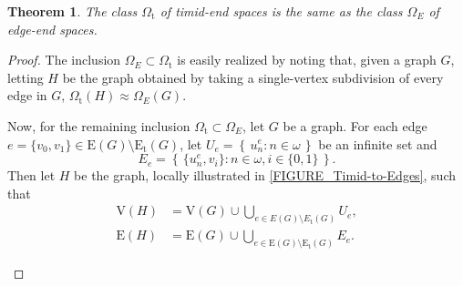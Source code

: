 \documentclass[10pt]{article}
\newcommand{\myref}[1]{\hyperref[#1]{\namecref{#1} \ref{#1}}}
\numberwithin{equation}{subsection}
\newtheorem{theorem}[equation]{Theorem}
\theoremstyle{remark}
\newcommand{\set}[1]{\left\{\, {#1} \,\right\}}
\begin{document}
\begin{theorem}\label{THM_EdgeEndsHomeoTimidEnds}
    The class $\Omega_{\mathrm{t}}$ of timid-end spaces is the same as the class $\Omega_E$ of edge-end spaces. 
\end{theorem}
\begin{proof}
    The inclusion $\Omega_E\subset \Omega_{\mathrm{t}}$ is easily realized by noting that, given a graph $G$, letting $H$ be the graph obtained by taking a single-vertex subdivision of every edge in $G$, $\Omega_{\mathrm{t}}(H) \approx \Omega_E(G)$.

    Now, for the remaining inclusion $\Omega_{\mathrm{t}}\subset \Omega_E$, let $G$ be a graph. For each edge $e = \{v_0,v_1\}\in \mathrm{E}(G)\setminus \mathrm{E}_\mathrm{t}(G)$, let $U_e = \set{u_n^e:n\in \omega}$ be an infinite set and  
    \[
    E_e = \set{\{u_n^e, v_i\}:n\in\omega, i\in \{0,1\}}.
    \]
    Then let $H$ be the graph, locally illustrated in \myref{FIGURE_Timid-to-Edges}, such that 
    \begin{align*}
        \mathrm{V}(H) &= \mathrm{V}(G)\cup \bigcup_{e\in E(G)\setminus E_\mathrm{t}(G)}U_e,\\
        \mathrm{E}(H) &= \mathrm{E}(G)\cup \bigcup_{e\in \mathrm{E}(G)\setminus \mathrm{E}_\mathrm{t}(G)}E_e.
    \end{align*}
    
    \begin{figure}[ht]
        \centering
\end{figure}
\end{proof}
\end{document}

